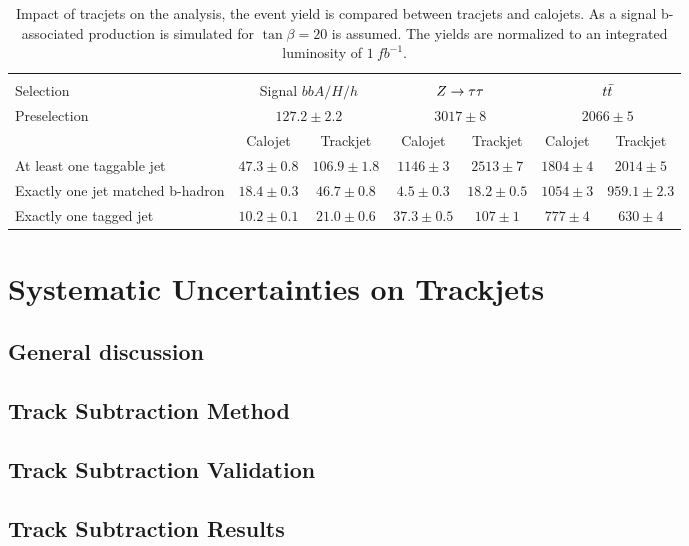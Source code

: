 \begin{table}[tp]
	\begin{small}
	\begin{tabular}{p{4cm} |c c| c c| c c }
	\hline
	\hline\\ 
Selection 	& 	\multicolumn{2}{|c|}{Signal $bbA/H/h$ }	&\multicolumn{2}{c|}{$Z\rightarrow \tau\tau$}	& \multicolumn{2}{c}{$t\bar{t}$}	\\
	[0.5cm]
	\hline
Preselection		&	\multicolumn{2}{|c|}{$127.2 \pm 2.2$} &\multicolumn{2}{c|}{$3017 \pm 8$} &\multicolumn{2}{c}{$2066 \pm 5$} \\[0.5cm]
			&	Calojet		&	Trackjet &Calojet	&Trackjet	&Calojet	&Trackjet \\[0.5cm]
At least one taggable jet& $47.3 \pm0.8$	&$106.9 \pm1.8$	 &$1146 \pm3 $	&$2513 \pm 7$	&$1804 \pm 4$	&$2014 \pm 5$ \\[0.5cm]
Exactly one jet matched b-hadron& $18.4 \pm 0.3$ & $46.7 \pm 0.8$ & $4.5 \pm 0.3$	&$18.2 \pm 0.5$ 	&$1054 \pm 3$	&$959.1 \pm 2.3$  \\[1cm]
Exactly one tagged jet&	$10.2 \pm0.1$	&$21.0 \pm 0.6$	& $37.3 \pm 0.5$ &$107 \pm 1$ &$777 \pm 4$	&$630 \pm4$ \\[1cm]
	\hline
	\hline
	
	\end{tabular}
	\end{small}
	\caption{Impact of tracjets on the analysis, the event yield is compared between tracjets and calojets.
		As a signal b-associated production is simulated for $\tan\beta=20$ is assumed. The yields
		are normalized to an integrated luminosity of $1 ~ fb^{-1}$.}
	\label{tab:tj_cj}
\end{table}

\section{Systematic Uncertainties on Trackjets}
\subsection{General discussion}
\subsection{Track Subtraction Method} %
\subsection{Track Subtraction Validation} %
\subsection{Track Subtraction Results}

